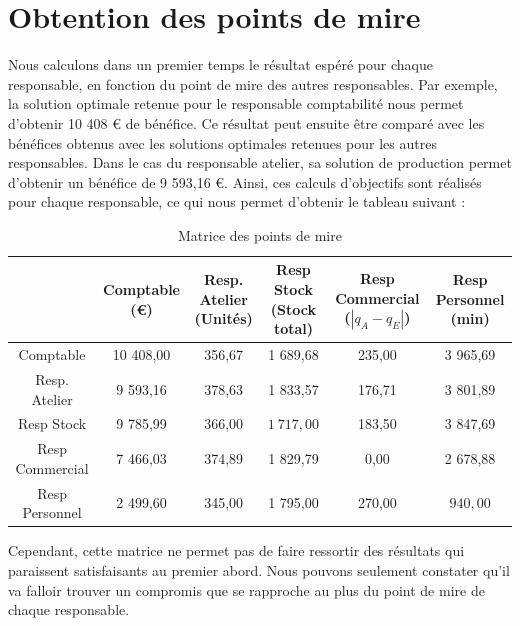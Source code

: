\documentclass[paper=a4, fontsize=11pt]{report}
\numberwithin{equation}{section}		%
\numberwithin{figure}{section}			%
\numberwithin{table}{section}				%
\newcommand\abs[1]{\left|#1\right|}
\begin{document}
\section{Obtention des points de mire}

Nous calculons dans un premier temps le résultat espéré pour chaque responsable, en fonction du point de mire des autres responsables. Par exemple, la solution optimale retenue pour le responsable comptabilité nous permet d'obtenir 10 408 € de bénéfice. Ce résultat peut ensuite être comparé avec les bénéfices obtenus avec les solutions optimales retenues pour les autres responsables. Dans le cas du responsable atelier, sa solution de production permet d'obtenir un bénéfice de 9 593,16 €. Ainsi, ces calculs d'objectifs sont réalisés pour chaque responsable, ce qui nous permet d'obtenir le tableau suivant :

\begin{table}[H]
\begin{center}
\begin{tabular}{c|ccccc}
 & \shortstack{Comptable \\ \scriptsize{(€)}} & \shortstack{Resp. Atelier \\ \scriptsize (Unités)} & \shortstack{Resp Stock \\ \scriptsize (Stock total)} & \shortstack{Resp Commercial \\ \scriptsize ($\abs{q_A - q_E}$)} &   \shortstack{Resp Personnel \\ \scriptsize (min)} \\ 
\hline 
Comptable &  \cellcolor{blue!10} 10 408,00 & 356,67 & 1 689,68 & 235,00 & 3 965,69 \\ 
Resp. Atelier & 9 593,16 & \cellcolor{blue!10}378,63 & 1 833,57 & 176,71 & 3 801,89 \\ 
Resp Stock & 9 785,99 & 366,00 & \cellcolor{blue!10}$1\:717,00$ & 183,50 & 3 847,69 \\ 
Resp Commercial & 7 466,03 & 374,89 & 1 829,79 & \cellcolor{blue!10} 0,00 & 2 678,88 \\ 
Resp Personnel & 2 499,60 & 345,00 & 1 795,00 & 270,00 & \cellcolor{blue!10}$940,00$ \\ 
\end{tabular}
\caption{Matrice des points de mire} 
\end{center}
\end{table}

Cependant, cette matrice ne permet pas de faire ressortir des résultats qui paraissent satisfaisants au premier abord. Nous pouvons seulement constater qu'il va falloir trouver un compromis que se rapproche au plus du point de mire de chaque responsable.
\end{document}
